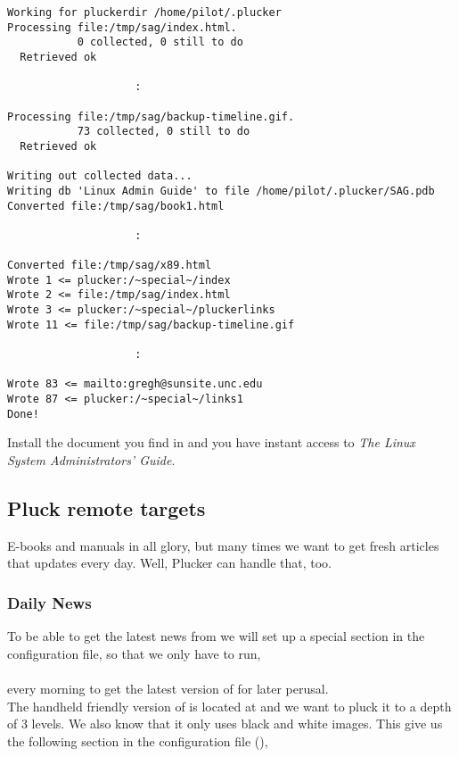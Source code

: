 \begin{verbatim}
Working for pluckerdir /home/pilot/.plucker
Processing file:/tmp/sag/index.html.
           0 collected, 0 still to do
  Retrieved ok

                    :

Processing file:/tmp/sag/backup-timeline.gif.
           73 collected, 0 still to do
  Retrieved ok

Writing out collected data...
Writing db 'Linux Admin Guide' to file /home/pilot/.plucker/SAG.pdb
Converted file:/tmp/sag/book1.html

                    :

Converted file:/tmp/sag/x89.html
Wrote 1 <= plucker:/~special~/index
Wrote 2 <= file:/tmp/sag/index.html
Wrote 3 <= plucker:/~special~/pluckerlinks
Wrote 11 <= file:/tmp/sag/backup-timeline.gif

                    :

Wrote 83 <= mailto:gregh@sunsite.unc.edu
Wrote 87 <= plucker:/~special~/links1
Done!

\end{verbatim}

Install the document you find in  and
you have instant access to \emph{The Linux System Administrators' Guide}.


\subsection{Pluck remote targets}

E-books and manuals in all glory, but many times we want to get fresh
articles that updates every day. Well, Plucker can handle that, too.

\subsubsection{Daily News}

To be able to get the latest news from  we will set up a
special section in the configuration file, so that we only have to run,\\

\\

every morning to get the latest version of  for later perusal.\\

The handheld friendly version of  is located at
 and we want to pluck it
to a depth of 3 levels. We also know that it only uses black and white
images. This give us the following section in the configuration file
(),

